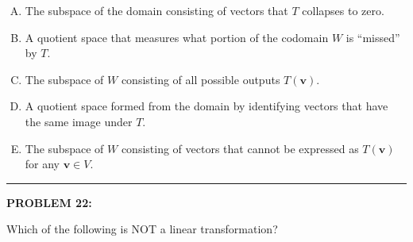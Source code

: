 \documentclass[12pt]{amsart}
\newcommand{\divider}{
  \vspace{-1em} %
  \noindent
  \raisebox{-0.15ex}{\textbullet}%
  \hspace{0.5em}%
  \rule[0.5ex]{0.95\textwidth}{1.0pt}%
  \hspace{0.5em}%
  \raisebox{-0.15ex}{\textbullet}%
  \vspace{0em} %
}
\begin{document}
\begin{enumerate}[(A)]
\item The subspace of the domain consisting of vectors that $T$ collapses to zero.

\item A quotient space that measures what portion of the codomain $W$ is ``missed'' by $T$.

\item The subspace of $W$ consisting of all possible outputs $T(\mathbf{v})$.

\item A quotient space formed from the domain by identifying vectors that have the same image under $T$.

\item The subspace of $W$ consisting of vectors that cannot be expressed as $T(\mathbf{v})$ for any $\mathbf{v} \in V$.
\end{enumerate}


\divider



{\bf PROBLEM 22:}

Which of the following is NOT a linear transformation?
\end{document}
